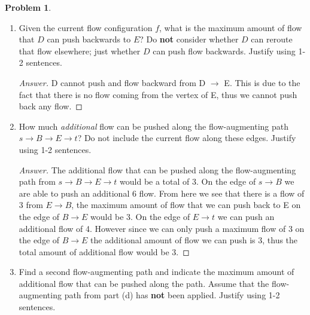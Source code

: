 \documentclass[11pt]{article}
\theoremstyle{definition}
\theoremstyle{definition}
\newtheorem{required}{Problem}
\theoremstyle{definition}
\begin{document}
\begin{required}
\begin{enumerate}[label=(\alph*)]
\begin{proof}[Answer]
There is a flow of 3 being pushed back from B $\rightarrow$ E. Since there is a total amount of 3 flow being pushed from E $\rightarrow$ B, the residual amount of flow coming from B $\rightarrow$ E would have a capacity of 0 and a flow of -3 and the flow after some arithmetic would be a total of 3 from B $\rightarrow$ E.
\end{proof}



\vskip 10pt
\item Given the current flow configuration $f$, what is the maximum amount of flow that $D$ can push backwards to $E$? Do \textbf{not} consider whether $D$ can reroute that flow elsewhere; just whether $D$ can push flow backwards. Justify using 1-2 sentences.

\begin{proof}[Answer]
D cannot push and flow backward from D $\rightarrow$ E. This is due to the fact that there is no flow coming from the vertex of E, thus we cannot push back any flow.
\end{proof}


\newpage
\item How much \textit{additional} flow can be pushed along the flow-augmenting path $s \to B \to E \to t$? Do not include the current flow along these edges. Justify using 1-2 sentences.

\begin{proof}[Answer]
The additional flow that can be pushed along the flow-augmenting path from $s \to B \to E \to t$ would be a total of 3. On the edge of  $s \to B$ we are able to push an additional 6 flow. From here we see that there is a flow of 3 from $E \to B$, the maximum amount of flow that we can push back to E on the edge of $B \to E$ would be 3. On the edge of  $E \to t$ we can push an additional flow of 4. However since we can only push a maximum flow of 3 on the edge of $B \to E$ the additional amount of flow we can push is 3, thus the total amount of additional flow would be 3.
\end{proof}


\vskip 10pt
\item Find a second flow-augmenting path and indicate the maximum amount of additional flow that can be pushed along the path. Assume that the flow-augmenting path from part (d) has \textbf{not} been applied. Justify using 1-2 sentences.


\end{enumerate}
\end{required}
\end{document}
